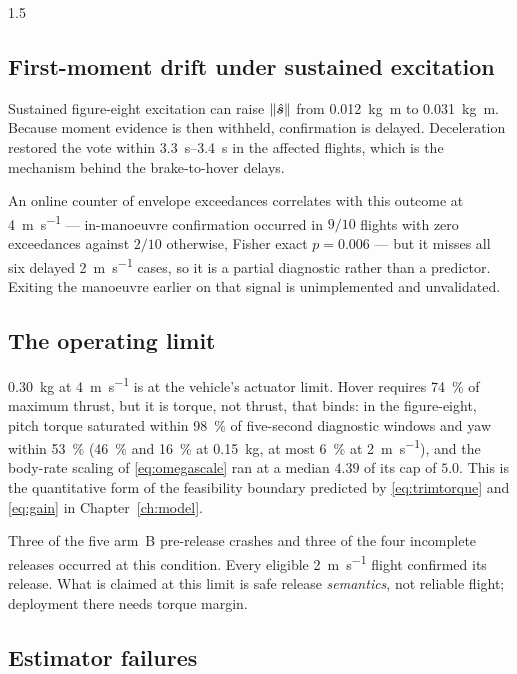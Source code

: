 \begin{spacing}{1.5}
\subsection{First-moment drift under sustained excitation}\label{sec:eval:drift}

Sustained figure-eight excitation can raise $\lVert\hat{\bm{s}}\rVert$ from
\SI{0.012}{\kg\meter} to \SI{0.031}{\kg\meter}. Because moment evidence is then
withheld, confirmation is delayed. Deceleration restored the vote within
\SIrange{3.3}{3.4}{\second} in the affected flights, which is the mechanism
behind the brake-to-hover delays.

An online counter of envelope exceedances correlates with this outcome at
\SI{4}{\meter\per\second} --- in-manoeuvre confirmation occurred in $9/10$
flights with zero exceedances against $2/10$ otherwise, Fisher exact
$p=0.006$ --- but it misses all six delayed \SI{2}{\meter\per\second} cases, so it
is a partial diagnostic rather than a predictor. Exiting the manoeuvre earlier on
that signal is unimplemented and unvalidated.

\subsection{The operating limit}\label{sec:eval:opslimit}

\SI{0.30}{\kg} at \SI{4}{\meter\per\second} is at the vehicle's actuator limit.
Hover requires \SI{74}{\percent} of maximum thrust, but it is torque, not thrust,
that binds: in the figure-eight, pitch torque saturated within \SI{98}{\percent}
of five-second diagnostic windows and yaw within \SI{53}{\percent}
(\SI{46}{\percent} and \SI{16}{\percent} at \SI{0.15}{\kg}, at most
\SI{6}{\percent} at \SI{2}{\meter\per\second}), and the body-rate scaling of
\eqref{eq:omegascale} ran at a median $4.39$ of its cap of $5.0$. This is the
quantitative form of the feasibility boundary predicted by \eqref{eq:trimtorque}
and \eqref{eq:gain} in Chapter~\ref{ch:model}.

Three of the five arm~B pre-release crashes and three of the four incomplete
releases occurred at this condition. Every eligible \SI{2}{\meter\per\second}
flight confirmed its release. What is claimed at this limit is safe release
\emph{semantics}, not reliable flight; deployment there needs torque margin.

\subsection{Estimator failures}\label{sec:eval:estfail}


\end{spacing}
